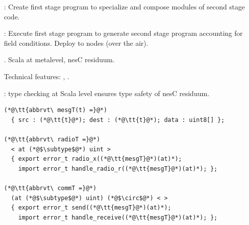 \centering
{}
\begin{citemize}
\item {}: Create first stage program to specialize and compose modules of second
  stage code.
\item {}: Execute first stage program to generate second stage program
  accounting for field conditions. Deploy to nodes (over the air).
\end{citemize}
\stopslide


\begin{citemize}
\item {}. Scala at metalevel, nesC residuum.
\item Technical features: , .
\item {}: type checking at Scala level ensures type safety of nesC
  residuum.
\item {}
\end{citemize}
\stopslide


\begin{lstlisting}[language=nesC]
(*@\tt{abbrvt\ mesgT(t) =}@*)
  { src : (*@\tt{t}@*); dest : (*@\tt{t}@*); data : uint8[] };

(*@\tt{abbrvt\ radioT =}@*)
  < at (*@$\subtype$@*) uint >
  { export error_t radio_x((*@\tt{mesgT}@*)(at)*); 
    import error_t handle_radio_r((*@\tt{mesgT}@*)(at)*); };

(*@\tt{abbrvt\ commT =}@*)
  (at (*@$\subtype$@*) uint) (*@$\circ$@*) < >
  { export error_t send((*@\tt{mesgT}@*)(at)*); 
    import error_t handle_receive((*@\tt{mesgT}@*)(at)*); };
\end{lstlisting}
\stopslide

